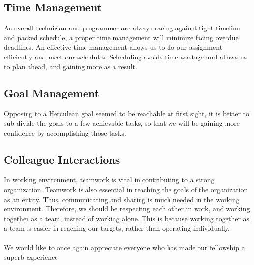 \documentclass[12pt,a4paper]{report}
\begin{document}
\subsection*{Time Management}
As overall technician and programmer are always racing against tight timeline and packed schedule, a proper time management will minimize facing overdue deadlines. An effective time management allows us to do our assignment efficiently and meet our schedules. Scheduling avoids time wastage and allows us to plan ahead, and gaining more as a result. 

\subsection*{Goal Management}
Opposing to a Herculean goal seemed to be reachable at first sight, it is better to sub-divide the goals to a few achievable tasks, so that we will be gaining more confidence by accomplishing those tasks. 

\subsection*{Colleague Interactions}
In working environment, teamwork is vital in contributing to a strong organization. Teamwork is also essential in reaching the goals of the organization as an entity. Thus, communicating and sharing is much needed in the working environment. Therefore, we should be respecting each other in work, and working together as a team, instead of working alone. This is because working together as a team is easier in reaching our targets, rather than operating individually. 
\\\\
We would like to once again appreciate everyone who has made our fellowship a superb experience
\end{document}

